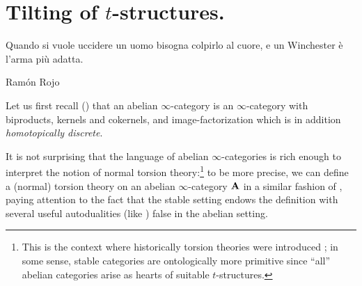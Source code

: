 \section{Tilting of $t$\hyp{}structures.}
\epigraph{Quando si vuole uccidere un uomo bisogna colpirlo al cuore, e un Winchester è l'arma più adatta.}{Ramón Rojo}
Let us first recall (\adef {}) that an abelian $\infty$\hyp{}category is an $\infty$\hyp{}category with biproducts, kernels and cokernels, and image\hyp{}factorization which is in addition \emph{homotopically discrete}.

It is not surprising that the language of abelian $\infty$\hyp{}categories is rich enough to interpret the notion of normal torsion theory:\footnote{This is the context where historically torsion theories were introduced \cite{dickson1966torsion}; in some sense, stable categories are ontologically more primitive since ``all'' abelian categories arise as hearts of suitable $t$\hyp{}structures.} to be more precise, we can define a (normal) torsion theory on an abelian $\infty$\hyp{}category $\mathbf{A}$ in a similar fashion of \adef {}, paying attention to the fact that the stable setting endows the definition with several useful autodualities (like ) false in the abelian setting.

